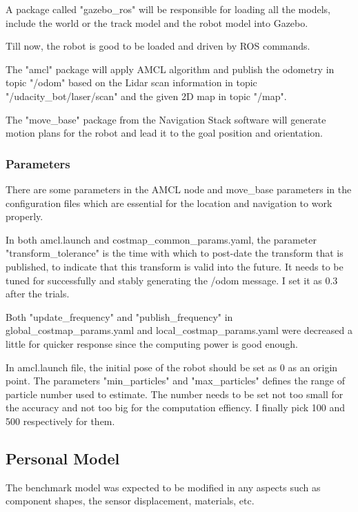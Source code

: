 \documentclass[10pt,journal,compsoc]{IEEEtran}
\begin{document}
A package called "gazebo\_ros" will be responsible for loading all the models, include the world or the track model and the robot model into Gazebo.

Till now, the robot is good to be loaded and driven by ROS commands.

The "amcl" package will apply AMCL algorithm and publish the odometry in topic "\slash odom" based on the Lidar scan information in topic "\slash{udacity\_bot}\slash{laser}\slash{scan}" and the given 2D map in topic "\slash map".

The "move\_base" package from the Navigation Stack software will generate motion plans for the robot and lead it to the goal position and orientation.

\subsubsection{Parameters}

There are some parameters in the AMCL node and move\_base parameters in the configuration files which are essential for the location and navigation to work properly.

In both amcl.launch and costmap\_common\_params.yaml, the parameter "transform\_tolerance" is the time with which to post-date the transform that is published, to indicate that this transform is valid into the future. It needs to be tuned for successfully and stably generating the \slash{odom} message. I set it as 0.3 after the trials.

Both "update\_frequency" and "publish\_frequency" in global\_costmap\_params.yaml and local\_costmap\_params.yaml were decreased a little for quicker response since the computing power is good enough. 

In amcl.launch file, the initial pose of the robot should be set as 0 as an origin point. The parameters "min\_particles" and "max\_particles" defines the range of particle number used to estimate. The number needs to be set not too small for the accuracy and not too big for the computation effiency. I finally pick 100 and 500 respectively for them.

\subsection{Personal Model}

The benchmark model was expected to be modified in any aspects such as component shapes, the sensor displacement, materials, etc. 
\end{document}
